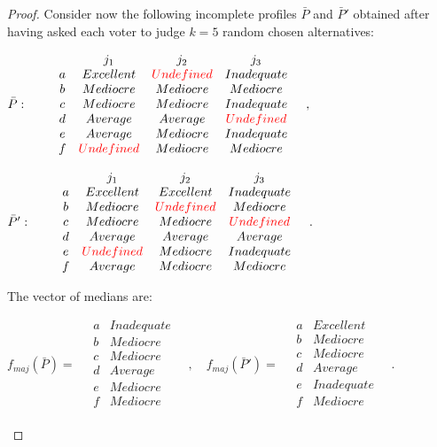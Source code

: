 \documentclass[version=3.21, pagesize, twoside=off, bibliography=totoc, DIV=calc, fontsize=12pt, a4paper]{scrartcl}
\begin{document}
\begin{proof}
	Consider now the following incomplete profiles $\bar{P}$ and $\bar{P}'$ obtained after having asked each voter to judge $k=5$ random chosen alternatives:
	\begin{center}
		$\bar{P}: \qquad
		\begin{array}{cccc}
			& j_1 & j_2 & j_3 \\
			a &	Excellent	& {\color{red}Undefined} & Inadequate\\
			b &	Mediocre	& Mediocre	& Mediocre\\
			c &	Mediocre	& Mediocre & Inadequate\\
			d &	Average	& Average	& {\color{red}Undefined} \\
			e &	Average	& Mediocre	& Inadequate \\
			f &	{\color{red}Undefined}	& Mediocre & Mediocre	  \\
		\end{array} \quad,
		$
	\end{center}
	\begin{center}
		$\bar{P}': \qquad
		\begin{array}{cccc}
			& j_1 & j_2 & j_3 \\
			a &	Excellent	& Excellent & Inadequate\\
			b &	Mediocre	& {\color{red}Undefined}	& Mediocre\\
			c &	Mediocre	& Mediocre & {\color{red}Undefined}\\
			d &	Average	& Average	& Average \\
			e &	{\color{red}Undefined}	& Mediocre	& Inadequate \\
			f &	Average	& Mediocre & Mediocre	  \\
		\end{array} \quad.
		$
	\end{center}
	The vector of medians are:
	\begin{center}
		$f_{maj}(\bar{P})= \quad
		\begin{array}{cc}
			a &	Inadequate \\
			b &	Mediocre \\
			c &	Mediocre \\
			d &	Average	\\
			e &	Mediocre \\
			f & Mediocre \\
		\end{array} \quad,\quad%
		f_{maj}(\bar{P}')= \quad
		\begin{array}{cc}
			a &	Excellent \\
			b &	Mediocre \\
			c &	Mediocre \\
			d &	Average	\\
			e &	Inadequate \\
			f & Mediocre \\
		\end{array} \quad.
		$
	\end{center}


\end{proof}
\end{document}
